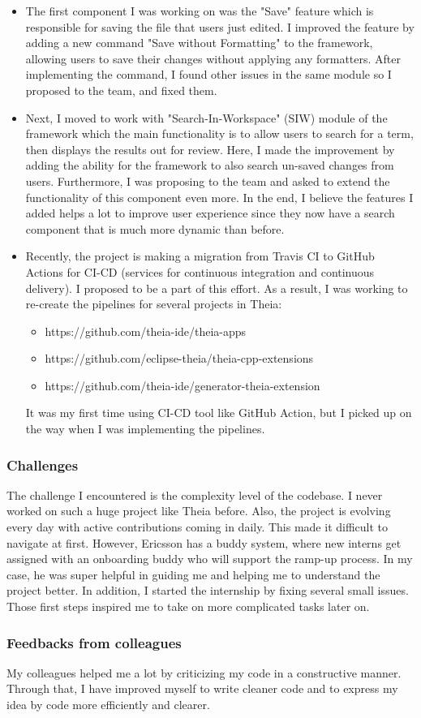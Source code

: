 \begin{itemize}
    \item 
The first component I was working on was the "Save" feature which is responsible for saving the file that users just edited.
I improved the feature by adding a new command "Save without Formatting" to the framework, allowing users to save their changes without applying any formatters.
After implementing the command, I found other issues in the same module so I proposed to the team, and fixed them.
    \item
Next, I moved to work with "Search-In-Workspace" (SIW) module of the framework which the main functionality is to allow users to search for a term, then displays the results out for review.
Here, I made the improvement by adding the ability for the framework to also search un-saved changes from users. Furthermore, I was proposing to the team and asked to extend the functionality of this component even more.
In the end, I believe the features I added helps a lot to improve user experience since they now have a search component that is much more dynamic than before.
    \item 
Recently, the project is making a migration from Travis CI to GitHub Actions for CI-CD (services for continuous integration and continuous delivery).
I proposed to be a part of this effort. As a result, I was working to re-create the pipelines for several projects in Theia:
        \begin{itemize}
            \item https://github.com/theia-ide/theia-apps
            \item https://github.com/eclipse-theia/theia-cpp-extensions
            \item https://github.com/theia-ide/generator-theia-extension
        \end{itemize}
It was my first time using CI-CD tool like GitHub Action, but I picked up on the way when I was implementing the pipelines.
\end{itemize}

\newpage
\subsubsection{Challenges}

The challenge I encountered is the complexity level of the codebase. I never worked on such a huge project like Theia before. Also, the project is evolving every day with active contributions coming in daily.
This made it difficult to navigate at first. However, Ericsson has a buddy system, where new interns get assigned with an onboarding buddy who will support the ramp-up process.
In my case, he was super helpful in guiding me and helping me to understand the project better.
In addition, I started the internship by fixing several small issues. Those first steps inspired me to take on more complicated tasks later on.

\subsubsection{Feedbacks from colleagues}
My colleagues helped me a lot by criticizing my code in a constructive manner.
Through that, I have improved myself to write cleaner code and to express my idea by code more efficiently and clearer.

